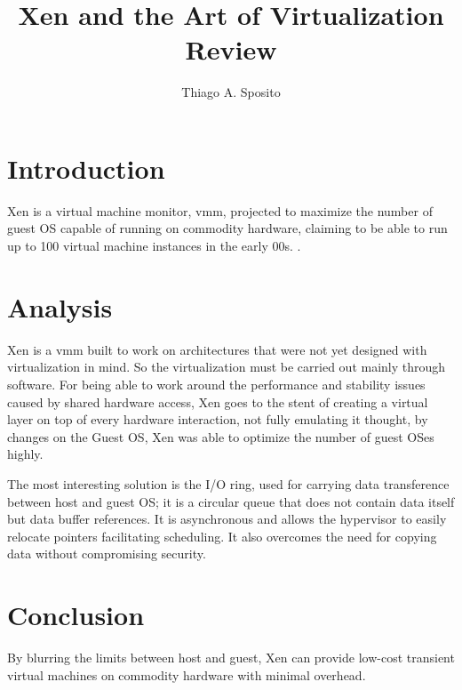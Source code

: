 \documentclass[12pt]{article}
\title{Xen and the Art of Virtualization Review}
\author{Thiago A. Sposito\inst{1} }
\begin{document}
 

\maketitle


\section{Introduction}
Xen is a virtual machine monitor, vmm, projected to maximize the number of guest OS capable of running on commodity hardware, claiming to be able to run up to 100 virtual machine instances in the early 00s. \cite{barham2003xen}.
\section{Analysis}
Xen is a vmm built to work on architectures that were not yet designed with virtualization in mind. So the virtualization must be carried out mainly through software. For being able to work around the performance and stability issues caused by shared hardware access, Xen goes to the stent of creating a virtual layer on top of every hardware interaction, not fully emulating it thought, by changes on the Guest OS, Xen was able to optimize the number of guest OSes highly.

The most interesting solution is the I/O ring, used for carrying data transference between host and guest OS; it is a circular queue that does not contain data itself but data buffer references. It is asynchronous and allows the hypervisor to easily relocate pointers facilitating scheduling. It also overcomes the need for copying data without compromising security.
\section{Conclusion}
By blurring the limits between host and guest, Xen can provide low-cost transient virtual machines on commodity hardware with minimal overhead.



\end{document}
